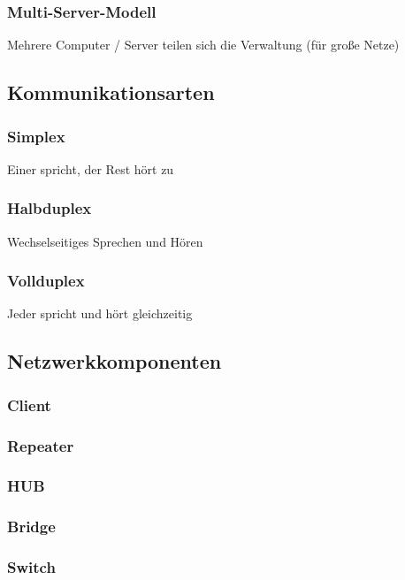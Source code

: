 \documentclass[12pt,a4paper]{article}
\begin{document}
\subsubsection{Multi-Server-Modell}
Mehrere Computer / Server teilen sich die Verwaltung (für große Netze)

\subsection{Kommunikationsarten}

\subsubsection{Simplex}
Einer spricht, der Rest hört zu

\subsubsection{Halbduplex}
Wechselseitiges Sprechen und Hören

\subsubsection{Vollduplex}
Jeder spricht und hört gleichzeitig

\subsection{Netzwerkkomponenten}

\subsubsection{Client}

\subsubsection{Repeater}

\subsubsection{HUB}

\subsubsection{Bridge}

\subsubsection{Switch}
\end{document}
